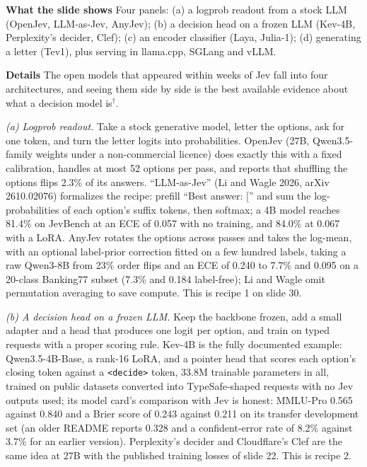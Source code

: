 \documentclass[11pt,letterpaper]{article}
\newcommand{\para}[1]{\medskip\noindent\textbf{#1}\quad}
\begin{document}
\para{What the slide shows} Four panels: (a) a logprob readout from a stock LLM (OpenJev, LLM-as-Jev, AnyJev); (b) a decision head on a frozen LLM (Kev-4B, Perplexity's decider, Clef); (c) an encoder classifier (Laya, Julia-1); (d) generating a letter (Tev1), plus serving in llama.cpp, SGLang and vLLM.

\para{Details} The open models that appeared within weeks of Jev fall into four architectures, and seeing them side by side is the best available evidence about what a decision model is$^\dagger$.

\emph{(a) Logprob readout.} Take a stock generative model, letter the options, ask for one token, and turn the letter logits into probabilities. OpenJev (27B, Qwen3.5-family weights under a non-commercial licence) does exactly this with a fixed calibration, handles at most 52 options per pass, and reports that shuffling the options flips 2.3\% of its answers. ``LLM-as-Jev'' (Li and Wagle 2026, arXiv 2610.02076) formalizes the recipe: prefill ``Best answer: ['' and sum the log-probabilities of each option's suffix tokens, then softmax; a 4B model reaches 81.4\% on JevBench at an ECE of 0.057 with no training, and 84.0\% at 0.067 with a LoRA. AnyJev rotates the options across passes and takes the log-mean, with an optional label-prior correction fitted on a few hundred labels, taking a raw Qwen3-8B from 23\% order flips and an ECE of 0.240 to 7.7\% and 0.095 on a 20-class Banking77 subset (7.3\% and 0.184 label-free); Li and Wagle omit permutation averaging to save compute. This is recipe 1 on slide 30.

\emph{(b) A decision head on a frozen LLM.} Keep the backbone frozen, add a small adapter and a head that produces one logit per option, and train on typed requests with a proper scoring rule. Kev-4B is the fully documented example: Qwen3.5-4B-Base, a rank-16 LoRA, and a pointer head that scores each option's closing token against a \texttt{<decide>} token, 33.8M trainable parameters in all, trained on public datasets converted into TypeSafe-shaped requests with no Jev outputs used; its model card's comparison with Jev is honest: MMLU-Pro 0.565 against 0.840 and a Brier score of 0.243 against 0.211 on its transfer development set (an older README reports 0.328 and a confident-error rate of 8.2\% against 3.7\% for an earlier version). Perplexity's decider and Cloudflare's Clef are the same idea at 27B with the published training losses of slide 22. This is recipe 2.
\end{document}
